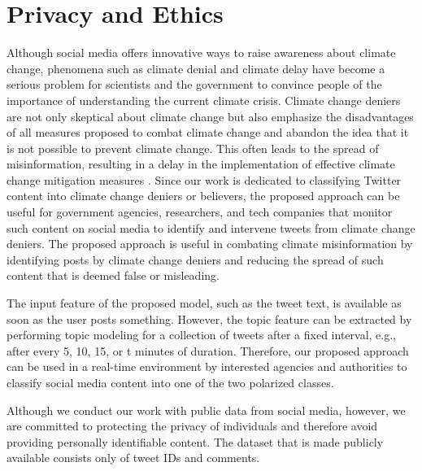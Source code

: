 \documentclass[letterpaper]{article}
\begin{document}
\section{Privacy and Ethics}
Although social media offers innovative ways to raise awareness about climate change, phenomena such as climate denial and climate delay have become a serious problem for scientists and the government to convince people of the importance of understanding the current climate crisis. Climate change deniers are not only skeptical about climate change but also emphasize the disadvantages of all measures proposed to combat climate change and abandon the idea that it is not possible to prevent climate change. This often leads to the spread of misinformation, resulting in a delay in the implementation of effective climate change mitigation measures \cite{zhou2021confirmation}. Since our work is dedicated to classifying Twitter content into climate change deniers or believers, the proposed approach can be useful for government agencies, researchers, and tech companies that monitor such content on social media to identify and intervene tweets from climate change deniers. The proposed approach is useful in combating climate misinformation by identifying posts by climate change deniers and reducing the spread of such content that is deemed false or misleading.
\par \noindent The input feature of the proposed model, such as the tweet text, is available as soon as the user posts something. However, the topic feature can be extracted by performing topic modeling for a collection of tweets after a fixed interval, e.g., after every 5, 10, 15, or t minutes of duration. Therefore, our proposed approach can be used in a real-time environment by interested agencies and authorities to classify social media content into one of the two polarized classes.
\par \noindent Although we conduct our work with public data from social media, however, we are committed to protecting the privacy of individuals and therefore avoid providing personally identifiable content. The dataset that is made publicly available consists only of tweet IDs and comments.
\end{document}
